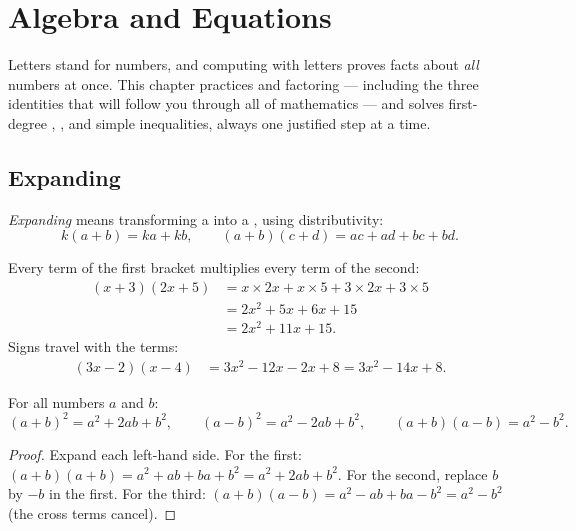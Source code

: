 \chapter{Algebra and Equations}\label{ch:g9:algebra}

Letters stand for numbers, and computing with letters proves facts about
\emph{all} numbers at once. This chapter practices  and
factoring --- including the three identities that will follow you through
all of mathematics --- and solves first-degree , 
, and simple inequalities, always one justified step at a time.

\section{Expanding}

\begin{definition}[Expanding]\label{def:g9:algebra:expand}
\emph{Expanding} means transforming a  into a
, using distributivity:
\[
k(a + b) = ka + kb,
\qquad
(a + b)(c + d) = ac + ad + bc + bd .
\]
\end{definition}

\begin{example}\label{ex:g9:algebra:expand}
Every term of the first bracket multiplies every term of the second:
\begin{align*}
(x + 3)(2x + 5)
&= x \times 2x + x \times 5 + 3 \times 2x + 3 \times 5 \\
&= 2x^2 + 5x + 6x + 15 \\
&= 2x^2 + 11x + 15 .
\end{align*}
Signs travel with the terms:
\begin{align*}
(3x - 2)(x - 4)
&= 3x^2 - 12x - 2x + 8
= 3x^2 - 14x + 8 .
\end{align*}
\end{example}

\begin{theorem}\label{thm:g9:algebra:identities}
For all numbers $a$ and $b$:
\[
(a+b)^2 = a^2 + 2ab + b^2,
\qquad
(a-b)^2 = a^2 - 2ab + b^2,
\qquad
(a+b)(a-b) = a^2 - b^2 .
\]
\end{theorem}

\begin{proof}
Expand each left-hand side. For the first:
$(a+b)(a+b) = a^2 + ab + ba + b^2 = a^2 + 2ab + b^2$. For the second,
replace $b$ by $-b$ in the first. For the third:
$(a+b)(a-b) = a^2 - ab + ba - b^2 = a^2 - b^2$ (the cross terms cancel).
\end{proof}


